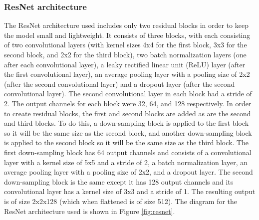 \documentclass{article}
\begin{document}
\subsubsection{ResNet architecture}
The ResNet architecture used includes only two residual blocks in order to keep the model small and lightweight. It consists of three blocks, with each consisting of two convolutional layers (with kernel sizes 4x4 for the first block, 3x3 for the second block, and 2x2 for the third block), two batch normalization layers (one after each convolutional layer), a leaky rectified linear unit (ReLU) layer (after the first convolutional layer), an average pooling layer with a pooling size of 2x2 (after the second convolutional layer) and a dropout layer (after the second convolutional layer). The second convolutional layer in each block had a stride of 2. The output channels for each block were 32, 64, and 128 respectively. In order to create residual blocks, the first and second blocks are added as are the second and third blocks. To do this, a down-sampling block is applied to the first block so it will be the same size as the second block, and another down-sampling block is applied to the second block so it will be the same size as the third block. The first down-sampling block has 64 output channels and consists of a convolutional layer with a kernel size of 5x5 and a stride of 2, a batch normalization layer, an average pooling layer with a pooling size of 2x2, and a dropout layer. The second down-sampling block is the same except it has 128 output channels and its convolutional layer has a kernel size of 3x3 and a stride of 1. The resulting output is of size 2x2x128 (which when flattened is of size 512). The diagram for the ResNet architecture used is shown in Figure \ref{fig:resnet}.
\end{document}
